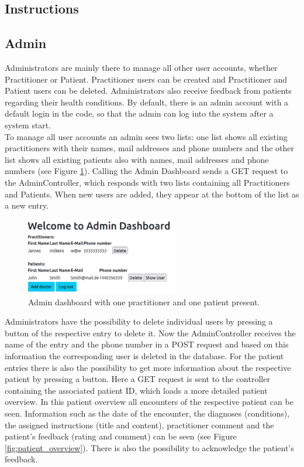\documentclass[]{report}
\begin{document}
\subsection{Instructions}

\subsection{Admin}
Administrators are mainly there to manage all other user accounts, whether Practitioner or Patient. Practitioner users can be created and Practitioner and Patient users can be deleted. Administrators also receive feedback from patients regarding their health conditions. By default, there is an admin account with a default login in the code, so that the admin can log into the system after a system start.\\
To manage all user accounts an admin sees two lists: one list shows all existing practitioners with their names, mail addresses and phone numbers and the other list shows all existing patients also with names, mail addresses and phone numbers (see Figure \ref{fig:admin_dashboard}). Calling the Admin Dashboard sends a GET request to the AdminController, which responds with two lists containing all Practitioners and Patients. When new users are added, they appear at the bottom of the list as a new entry.\\
\begin{figure}[h]
    \centering
    \includegraphics[width=0.6\textwidth]{Admin_Dashboard.png}
    \caption{Admin dashboard with one practitioner and one patient present.}
    \label{fig:admin_dashboard}
\end{figure}
Administrators have the possibility to delete individual users by pressing a button of the respective entry to delete it. Now the AdminController receives the name of the entry and the phone number in a POST request and based on this information the corresponding user is deleted in the database. For the patient entries there is also the possibility to get more information about the respective patient by pressing a button. Here a GET request is sent to the controller containing the associated patient ID, which loads a more detailed patient overview. In this patient overview all encounters of the respective patient can be seen. Information such as the date of the encounter, the diagnoses (conditions), the assigned instructions (title and content), practitioner comment and the patient's feedback (rating and comment) can be seen (see Figure \ref{fig:patient_overview}). There is also the possibility to acknowledge the patient's feedback.\\
\end{document}
